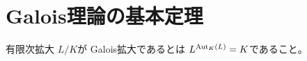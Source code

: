 \documentclass[../master_galois_theory]{subfiles}
\begin{document}
\setcounter{section}{1}

\section{Galois理論の基本定理}

\begin{defi}
  有限次拡大 $L/K$が \rm{Galois}拡大であるとは $L^{\mathrm{Aut}_K(L)} = K$であること。
\end{defi}
\end{document}

